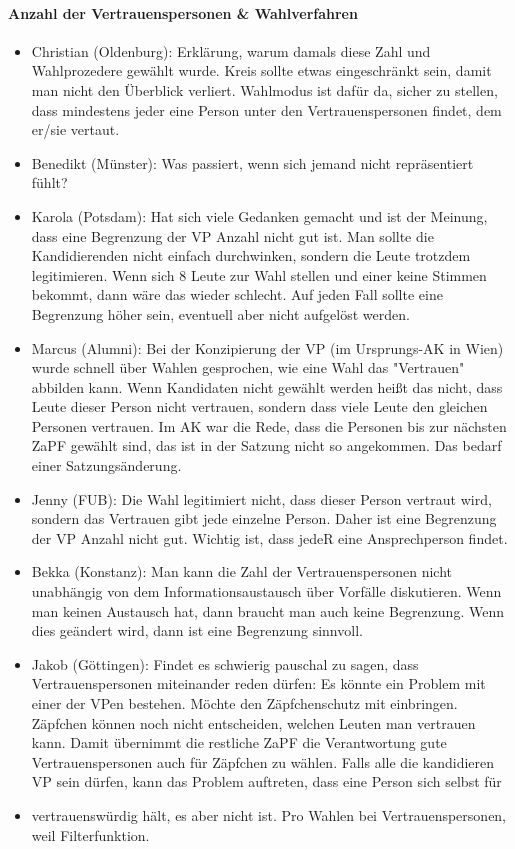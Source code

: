     \paragraph{Anzahl der Vertrauenspersonen \& Wahlverfahren}
      \begin{itemize}
        \item Christian (Oldenburg): Erklärung, warum damals diese Zahl und Wahlprozedere gewählt wurde. Kreis sollte etwas eingeschränkt sein, damit man nicht den Überblick verliert. Wahlmodus ist dafür da, sicher zu stellen, dass mindestens jeder eine Person unter den Vertrauenspersonen findet, dem er/sie vertaut.
        \item Benedikt (Münster): Was passiert, wenn sich jemand nicht repräsentiert fühlt?
        \item Karola (Potsdam): Hat sich viele Gedanken gemacht und ist der Meinung, dass eine Begrenzung der VP Anzahl nicht gut ist. Man sollte die Kandidierenden nicht einfach durchwinken, sondern die Leute trotzdem legitimieren. Wenn sich 8 Leute zur Wahl stellen und einer keine Stimmen bekommt, dann wäre das wieder schlecht. Auf jeden Fall sollte eine Begrenzung höher sein, eventuell aber nicht aufgelöst werden.
        \item Marcus (Alumni): Bei der Konzipierung der VP (im Ursprungs-AK in Wien) wurde schnell über Wahlen gesprochen, wie eine Wahl das "Vertrauen" abbilden kann. Wenn Kandidaten nicht gewählt werden heißt das nicht, dass Leute dieser Person nicht vertrauen, sondern dass viele Leute den gleichen Personen vertrauen. Im AK war die Rede, dass die Personen bis zur nächsten ZaPF gewählt sind, das ist in der Satzung nicht so angekommen. Das bedarf einer Satzungsänderung.
        \item Jenny (FUB): Die Wahl legitimiert nicht, dass dieser Person vertraut wird, sondern das Vertrauen gibt jede einzelne Person. Daher ist eine Begrenzung der VP Anzahl nicht gut. Wichtig ist, dass jedeR eine Ansprechperson findet.
        \item Bekka (Konstanz): Man kann die Zahl der Vertrauenspersonen nicht unabhängig von dem Informationsaustausch über Vorfälle diskutieren. Wenn man keinen Austausch hat, dann braucht man auch keine Begrenzung. Wenn dies geändert wird, dann ist eine Begrenzung sinnvoll.
        \item Jakob (Göttingen): Findet es schwierig pauschal zu sagen, dass Vertrauenspersonen miteinander reden dürfen: Es könnte ein Problem mit einer der VPen bestehen. Möchte den Zäpfchenschutz mit einbringen. Zäpfchen können noch nicht entscheiden, welchen Leuten man vertrauen kann. Damit übernimmt die restliche ZaPF die Verantwortung gute Vertrauenspersonen auch für Zäpfchen zu wählen. Falls alle die kandidieren VP sein dürfen, kann das Problem auftreten, dass eine Person sich selbst für \item vertrauenswürdig hält, es aber nicht ist. Pro Wahlen bei Vertrauenspersonen, weil Filterfunktion.

\end{itemize}
